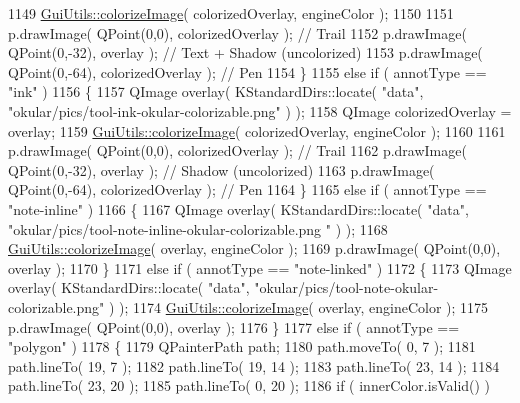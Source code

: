\begin{DoxyCode}
1149         \hyperlink{namespaceGuiUtils_a989345da409cc84c3636efad1b174cb5}{GuiUtils::colorizeImage}( colorizedOverlay, engineColor );
1150 
1151         p.drawImage( QPoint(0,0), colorizedOverlay ); \textcolor{comment}{// Trail}
1152         p.drawImage( QPoint(0,-32), overlay ); \textcolor{comment}{// Text + Shadow (uncolorized)}
1153         p.drawImage( QPoint(0,-64), colorizedOverlay ); \textcolor{comment}{// Pen}
1154     \}
1155     \textcolor{keywordflow}{else} \textcolor{keywordflow}{if} ( annotType == \textcolor{stringliteral}{"ink"} )
1156     \{
1157         QImage overlay( KStandardDirs::locate( \textcolor{stringliteral}{"data"}, \textcolor{stringliteral}{"okular/pics/tool-ink-okular-colorizable.png"} ) );
1158         QImage colorizedOverlay = overlay;
1159         \hyperlink{namespaceGuiUtils_a989345da409cc84c3636efad1b174cb5}{GuiUtils::colorizeImage}( colorizedOverlay, engineColor );
1160 
1161         p.drawImage( QPoint(0,0), colorizedOverlay ); \textcolor{comment}{// Trail}
1162         p.drawImage( QPoint(0,-32), overlay ); \textcolor{comment}{// Shadow (uncolorized)}
1163         p.drawImage( QPoint(0,-64), colorizedOverlay ); \textcolor{comment}{// Pen}
1164     \}
1165     \textcolor{keywordflow}{else} \textcolor{keywordflow}{if} ( annotType == \textcolor{stringliteral}{"note-inline"} )
1166     \{
1167         QImage overlay( KStandardDirs::locate( \textcolor{stringliteral}{"data"}, \textcolor{stringliteral}{"okular/pics/tool-note-inline-okular-colorizable.png
      "} ) );
1168         \hyperlink{namespaceGuiUtils_a989345da409cc84c3636efad1b174cb5}{GuiUtils::colorizeImage}( overlay, engineColor );
1169         p.drawImage( QPoint(0,0), overlay );
1170     \}
1171     \textcolor{keywordflow}{else} \textcolor{keywordflow}{if} ( annotType == \textcolor{stringliteral}{"note-linked"} )
1172     \{
1173         QImage overlay( KStandardDirs::locate( \textcolor{stringliteral}{"data"}, \textcolor{stringliteral}{"okular/pics/tool-note-okular-colorizable.png"} ) );
1174         \hyperlink{namespaceGuiUtils_a989345da409cc84c3636efad1b174cb5}{GuiUtils::colorizeImage}( overlay, engineColor );
1175         p.drawImage( QPoint(0,0), overlay );
1176     \}
1177     \textcolor{keywordflow}{else} \textcolor{keywordflow}{if} ( annotType == \textcolor{stringliteral}{"polygon"} )
1178     \{
1179         QPainterPath path;
1180         path.moveTo( 0, 7 );
1181         path.lineTo( 19, 7 );
1182         path.lineTo( 19, 14 );
1183         path.lineTo( 23, 14 );
1184         path.lineTo( 23, 20 );
1185         path.lineTo( 0, 20 );
1186         \textcolor{keywordflow}{if} ( innerColor.isValid() )

\end{DoxyCode}
